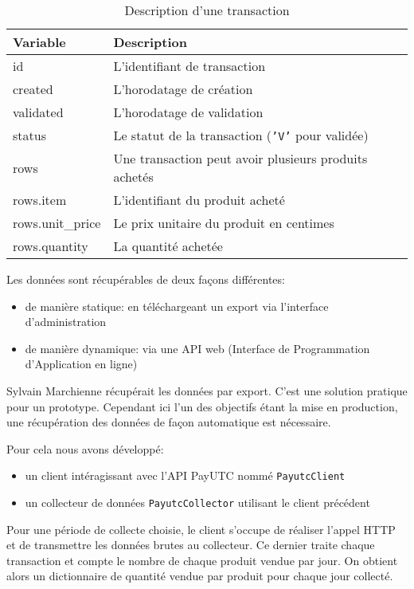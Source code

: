 \begin{table}[ht]
    \centering
    \begin{tabular}{l|l}
        Variable            & Description \\
        \hline
        id                  & L'identifiant de transaction \\
        created             & L'horodatage de création \\
        validated           & L'horodatage de validation \\
        status              & Le statut de la transaction (\texttt{'V'} pour validée) \\
        rows                & Une transaction peut avoir plusieurs produits achetés \\
        rows.item           & L'identifiant du produit acheté \\
        rows.unit\_price    & Le prix unitaire du produit en centimes \\
        rows.quantity       & La quantité achetée
    \end{tabular}
    \caption{Description d'une transaction}
    \label{tab:transaction_description}
\end{table}

Les données sont récupérables de deux façons différentes:
\begin{itemize}[nolistsep]
    \item de manière statique: en téléchargeant un export via l'interface d'administration
    \item de manière dynamique: via une API web (Interface de Programmation d'Application en ligne) 
\end{itemize}

Sylvain Marchienne récupérait les données par export. C'est une solution pratique pour un prototype. Cependant ici l'un des objectifs étant la mise en production, une récupération des données de façon automatique est nécessaire.

Pour cela nous avons développé:
\begin{itemize}[nolistsep]
    \item un client intéragissant avec l'API PayUTC nommé \lstinline{PayutcClient}
    \item un collecteur de données \lstinline{PayutcCollector} utilisant le client précédent
\end{itemize}

Pour une période de collecte choisie, le client s'occupe de réaliser l'appel HTTP et de transmettre les données brutes au collecteur. Ce dernier traite chaque transaction et compte le nombre de chaque produit vendue par jour. On obtient alors un dictionnaire de quantité vendue par produit pour chaque jour collecté.

